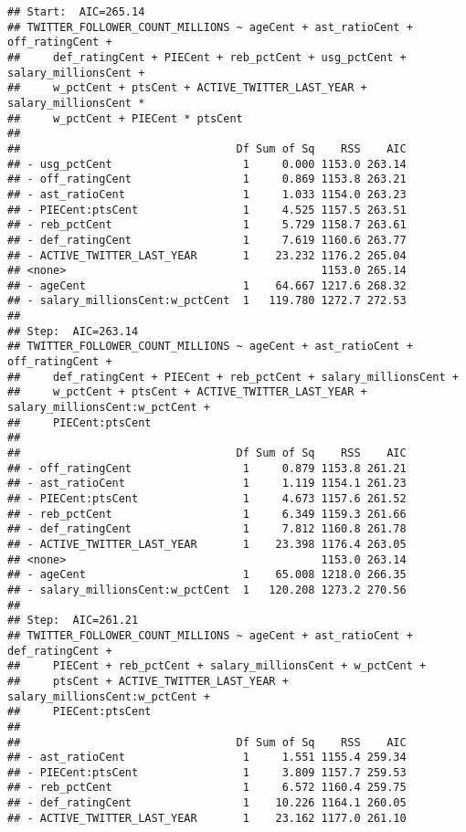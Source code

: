 \documentclass[]{article}
\begin{document}
\begin{verbatim}
## Start:  AIC=265.14
## TWITTER_FOLLOWER_COUNT_MILLIONS ~ ageCent + ast_ratioCent + off_ratingCent + 
##     def_ratingCent + PIECent + reb_pctCent + usg_pctCent + salary_millionsCent + 
##     w_pctCent + ptsCent + ACTIVE_TWITTER_LAST_YEAR + salary_millionsCent * 
##     w_pctCent + PIECent * ptsCent
## 
##                                 Df Sum of Sq    RSS    AIC
## - usg_pctCent                    1     0.000 1153.0 263.14
## - off_ratingCent                 1     0.869 1153.8 263.21
## - ast_ratioCent                  1     1.033 1154.0 263.23
## - PIECent:ptsCent                1     4.525 1157.5 263.51
## - reb_pctCent                    1     5.729 1158.7 263.61
## - def_ratingCent                 1     7.619 1160.6 263.77
## - ACTIVE_TWITTER_LAST_YEAR       1    23.232 1176.2 265.04
## <none>                                       1153.0 265.14
## - ageCent                        1    64.667 1217.6 268.32
## - salary_millionsCent:w_pctCent  1   119.780 1272.7 272.53
## 
## Step:  AIC=263.14
## TWITTER_FOLLOWER_COUNT_MILLIONS ~ ageCent + ast_ratioCent + off_ratingCent + 
##     def_ratingCent + PIECent + reb_pctCent + salary_millionsCent + 
##     w_pctCent + ptsCent + ACTIVE_TWITTER_LAST_YEAR + salary_millionsCent:w_pctCent + 
##     PIECent:ptsCent
## 
##                                 Df Sum of Sq    RSS    AIC
## - off_ratingCent                 1     0.879 1153.8 261.21
## - ast_ratioCent                  1     1.119 1154.1 261.23
## - PIECent:ptsCent                1     4.673 1157.6 261.52
## - reb_pctCent                    1     6.349 1159.3 261.66
## - def_ratingCent                 1     7.812 1160.8 261.78
## - ACTIVE_TWITTER_LAST_YEAR       1    23.398 1176.4 263.05
## <none>                                       1153.0 263.14
## - ageCent                        1    65.008 1218.0 266.35
## - salary_millionsCent:w_pctCent  1   120.208 1273.2 270.56
## 
## Step:  AIC=261.21
## TWITTER_FOLLOWER_COUNT_MILLIONS ~ ageCent + ast_ratioCent + def_ratingCent + 
##     PIECent + reb_pctCent + salary_millionsCent + w_pctCent + 
##     ptsCent + ACTIVE_TWITTER_LAST_YEAR + salary_millionsCent:w_pctCent + 
##     PIECent:ptsCent
## 
##                                 Df Sum of Sq    RSS    AIC
## - ast_ratioCent                  1     1.551 1155.4 259.34
## - PIECent:ptsCent                1     3.809 1157.7 259.53
## - reb_pctCent                    1     6.572 1160.4 259.75
## - def_ratingCent                 1    10.226 1164.1 260.05
## - ACTIVE_TWITTER_LAST_YEAR       1    23.162 1177.0 261.10

\end{verbatim}
\end{document}
